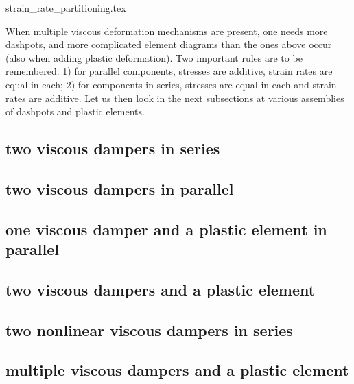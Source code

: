 \begin{flushright} {\tiny {\color{gray} strain\_rate\_partitioning.tex}} \end{flushright}

When multiple viscous deformation mechanisms are present, one needs more dashpots, and 
more complicated element diagrams than the ones above occur (also when adding plastic deformation).
Two important rules are to be remembered:
1) for parallel components, stresses are additive, strain rates are equal in each; 
2) for components in series, stresses are equal in each and strain rates are additive. 
Let us then look in the next subsections at various assemblies of dashpots and plastic elements.

\subsection{two viscous dampers in series} 


\subsection{two viscous dampers in parallel}


\subsection{one viscous damper and a plastic element in parallel}


\subsection{two viscous dampers and a plastic element} 


\subsection{two nonlinear viscous dampers in series} 


\subsection{multiple viscous dampers and a plastic element} 


